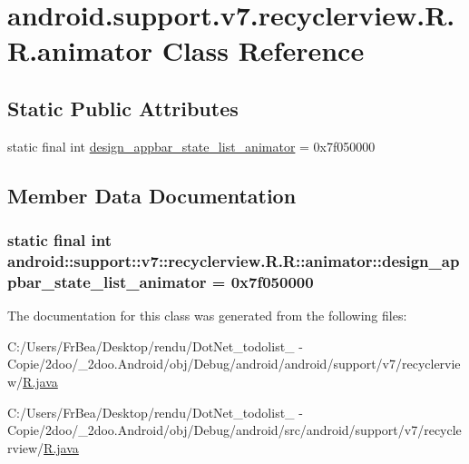\hypertarget{classandroid_1_1support_1_1v7_1_1recyclerview_1_1_r_1_1animator}{
\section{android.support.v7.recyclerview.R.R.animator Class Reference}
\label{classandroid_1_1support_1_1v7_1_1recyclerview_1_1_r_1_1animator}
}
\subsection*{Static Public Attributes}
\begin{CompactItemize}
\item 
static final int \hyperlink{classandroid_1_1support_1_1v7_1_1recyclerview_1_1_r_1_1animator_3ae7bdefa3c65ded9e8f522febfa5dab}{design\_\-appbar\_\-state\_\-list\_\-animator} = 0x7f050000
\end{CompactItemize}


\subsection{Member Data Documentation}
\hypertarget{classandroid_1_1support_1_1v7_1_1recyclerview_1_1_r_1_1animator_3ae7bdefa3c65ded9e8f522febfa5dab}{
\subsubsection[{design\_\-appbar\_\-state\_\-list\_\-animator}]{\setlength{\rightskip}{0pt plus 5cm}static final int android::support::v7::recyclerview.R.R::animator::design\_\-appbar\_\-state\_\-list\_\-animator = 0x7f050000}}
\label{classandroid_1_1support_1_1v7_1_1recyclerview_1_1_r_1_1animator_3ae7bdefa3c65ded9e8f522febfa5dab}




The documentation for this class was generated from the following files:\begin{CompactItemize}
\item 
C:/Users/FrBea/Desktop/rendu/DotNet\_\-todolist\_ - Copie/2doo/\_\-2doo.Android/obj/Debug/android/android/support/v7/recyclerview/\hyperlink{android_2support_2v7_2recyclerview_2_r_8java}{R.java}\item 
C:/Users/FrBea/Desktop/rendu/DotNet\_\-todolist\_ - Copie/2doo/\_\-2doo.Android/obj/Debug/android/src/android/support/v7/recyclerview/\hyperlink{src_2android_2support_2v7_2recyclerview_2_r_8java}{R.java}\end{CompactItemize}
